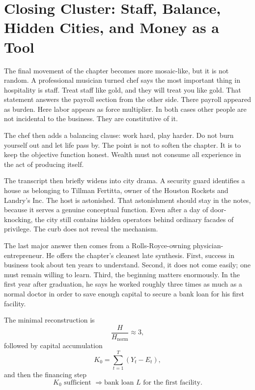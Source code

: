 \section{Closing Cluster: Staff, Balance, Hidden Cities, and Money as a Tool}

The final movement of the chapter becomes more mosaic-like, but it is not random. A professional musician turned chef says the most important thing in hospitality is staff. Treat staff like gold, and they will treat you like gold. That statement answers the payroll section from the other side. There payroll appeared as burden. Here labor appears as force multiplier. In both cases other people are not incidental to the business. They are constitutive of it.

The chef then adds a balancing clause: work hard, play harder. Do not burn yourself out and let life pass by. The point is not to soften the chapter. It is to keep the objective function honest. Wealth must not consume all experience in the act of producing itself.

The transcript then briefly widens into city drama. A security guard identifies a house as belonging to Tillman Fertitta, owner of the Houston Rockets and Landry's Inc. The host is astonished. That astonishment should stay in the notes, because it serves a genuine conceptual function. Even after a day of door-knocking, the city still contains hidden operators behind ordinary facades of privilege. The curb does not reveal the mechanism.

The last major answer then comes from a Rolls-Royce-owning physician-entrepreneur. He offers the chapter's cleanest late synthesis. First, success in business took about ten years to understand. Second, it does not come easily; one must remain willing to learn. Third, the beginning matters enormously. In the first year after graduation, he says he worked roughly three times as much as a normal doctor in order to save enough capital to secure a bank loan for his first facility.

The minimal reconstruction is
\begin{equation}
\frac{H}{H_{\text{norm}}} \approx 3,
\end{equation}
followed by capital accumulation
\begin{equation}
K_0 = \sum_{t=1}^{T} (Y_t - E_t),
\end{equation}
and then the financing step
\begin{equation}
K_0 \text{ sufficient } \Longrightarrow \text{bank loan } L \text{ for the first facility.}
\end{equation}

